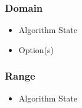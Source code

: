 \documentclass[../main.tex]{subfiles}
\begin{document}
\subsubsection{Domain}

\begin{itemize}
\item Algorithm State
\item Option(s)
\end{itemize}

\subsubsection{Range}

\begin{itemize}
\item Algorithm State
\end{itemize}
\end{document}
